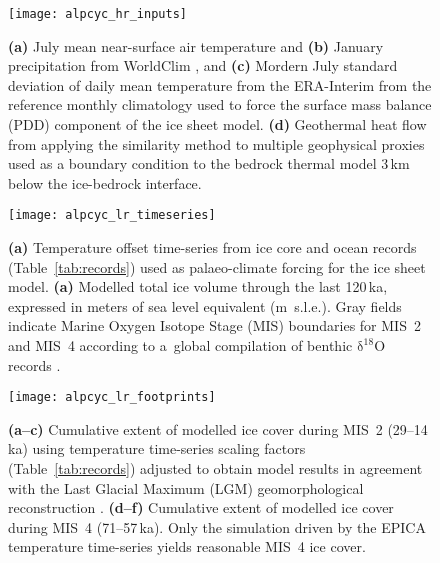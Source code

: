 \documentclass{article}
\newcommand{\chem}[1]{\ensuremath{\mathrm{#1}}}
\begin{document}
    \begin{figure}
      \centerline{\texttt{[image: alpcyc\_hr\_inputs]}}
      \caption{%
        \textbf{(a)} July mean near-surface air temperature and
        \textbf{(b)} January precipitation from WorldClim
        \citep[1960--1990]{Hijmans.etal.2005}, and
        \textbf{(c)} Mordern July standard deviation of daily mean temperature
        from the ERA-Interim \citep[1979--2012]{Dee.etal.2011} from the
        reference monthly climatology used to force the surface mass balance
        (PDD) component of the ice sheet model.
        \textbf{(d)} Geothermal heat flow from applying the similarity method
        to multiple geophysical proxies \citep{Goutorbe.etal.2011} used as a
        boundary condition to the bedrock thermal model 3\,km below the
        ice-bedrock interface.}
      \label{fig:inputs}
    \end{figure}

    \begin{figure}
      \centerline{\texttt{[image: alpcyc\_lr\_timeseries]}}
      \caption{%
        \textbf{(a)} Temperature offset time-series from ice core and ocean
        records (Table~\ref{tab:records}) used as palaeo-climate forcing for
        the ice sheet model.
        \textbf{(a)} Modelled total ice volume through the last 120\,ka,
        expressed in meters of sea level equivalent (m~s.l.e.). Gray fields
        indicate Marine Oxygen Isotope Stage (MIS) boundaries for MIS~2 and
        MIS~4 according to a~global compilation of benthic \chem{\delta^{18}O}
        records \citep{Lisiecki.Raymo.2005}.}
      \label{fig:timeseries}
    \end{figure}

    \begin{figure}
      \centerline{\texttt{[image: alpcyc\_lr\_footprints]}}
      \caption{%
        \textbf{(a--c)} Cumulative extent of modelled ice cover during MIS~2
        (29--14\,ka) using temperature time-series scaling factors
        (Table~\ref{tab:records}) adjusted to obtain model results in agreement
        with the Last Glacial Maximum (LGM) geomorphological reconstruction
        \citep[solid red line,][]{Ehlers.etal.2011}.
        \textbf{(d--f)} Cumulative extent of modelled ice cover during MIS~4
        (71--57\,ka). Only the simulation driven by the EPICA temperature
        time-series yields reasonable MIS~4 ice cover.}
      \label{fig:footprints}
    \end{figure}

\end{document}
